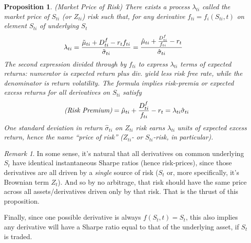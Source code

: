 \documentclass[12pt]{article}
\theoremstyle{plain}
\newtheorem{prop}[thm]{Proposition}
\theoremstyle{definition}
\theoremstyle{remark}
\newtheorem*{rmk}{Remark}
\begin{document}
\begin{prop}\emph{(Market Price of Risk)}
\label{2prop:lambda}
There exists a process $\lambda_{ti}$ called the
\emph{market price of $S_{ti}$ (or $Z_{ti}$) risk} such that, for any
derivative $f_{ti}=f_i(S_{ti},t)$ on element $S_{ti}$ of underlying
$S_t$
\begin{align}
  \lambda_{ti}
  &=
  \frac{%
    \tilde{\mu}_{ti}+D_{ti}^f
    -
    r_tf_{ti}
  }{\tilde{\sigma}_{ti}}
  =
  \frac{%
    \hat{\mu}_{ti}+\frac{D_{ti}^f}{f_{ti}}
    -
    r_t
  }{\hat{\sigma}_{ti}}
  \label{2lambda}
\end{align}
The second expression divided through by $f_{ti}$ to express
$\lambda_{ti}$ terms of expected returns: numerator is expected return
plus div. yield less risk free rate, while the denominator is return
volatility.  The formula implies risk-premia or expected excess returns
for \emph{all} derivatives on $S_{ti}$ satisfy
\begin{align*}
  \text{\emph{(Risk Premium)}}
  =
  \hat{\mu}_{ti}+\frac{D_{ti}^f}{f_{ti}}
  -
  r_t
  =
  \lambda_{ti}\hat{\sigma}_{ti}
\end{align*}
One standard deviation in return $\hat{\sigma}_{ti}$ on $Z_{ti}$ risk
earns $\lambda_{ti}$ units of expected excess return, hence the name
``price of risk'' ($Z_{ti}$- or $S_{ti}$-risk, in particular).
\end{prop}
\begin{rmk}
In some sense, it's natural that all derivatives on common underlying
$S_t$ have identical instantaneous Sharpe ratios (hence risk-prices),
since those derivatives are all driven by a \emph{single} source of risk
($S_t$ or, more specifically, it's Brownian term $Z_t$).
And so by no arbitrage, that risk should have the same price across all
assets/derivatives driven only by that risk.
That is the thrust of this proposition.

Finally, since one possible derivative is always $f(S_t,t)=S_t$, this
also implies any derivative will have a Sharpe ratio equal to that of
the underlying asset, if $S_t$ is traded.
\end{rmk}
\end{document}
